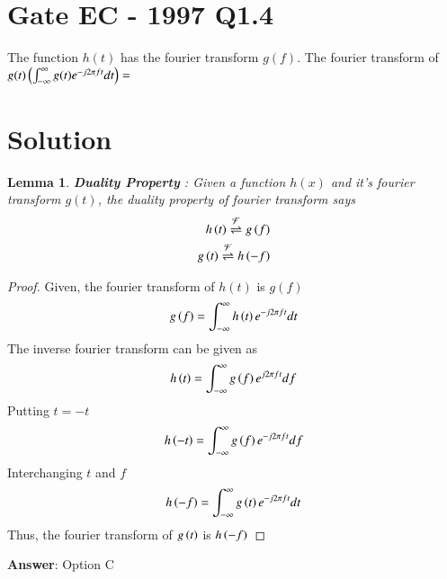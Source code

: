 \documentclass[journal,12pt,twocolumn]{IEEEtran}
\newtheorem{lemma}[theorem]{Lemma}
\begin{document}
\section*{Gate EC - 1997 Q1.4}
The function $h(t)$ has the fourier transform $g(f)$. The fourier transform of $g(t) \left( \int_{-\infty}^{\infty} g(t) e^{-j2\pi f t} dt\right) = $
\section*{Solution}
\begin{lemma}
\textbf{Duality Property} : Given a function $h(x)$ and it's fourier transform $g(t)$, the duality property of fourier transform says
\begin{align}
    h\left(t\right) \overset{\mathcal{F}}{ \rightleftharpoons}{g} \left(f\right)\\
    g\left(t\right) \overset{\mathcal{F}}{ \rightleftharpoons}{h} \left(-f\right)
\end{align}
\end{lemma}
\begin{proof}
Given, the fourier transform of $h(t)$ is $g(f)$
\begin{align}
    g\left(f\right) = \int_{-\infty}^{\infty} h\left(t\right) e^{-j2\pi ft} dt
\end{align}
The inverse fourier transform can be given as
\begin{align}
    h\left(t\right) = \int_{-\infty}^{\infty} g\left(f\right) e^{j2\pi ft} df
\end{align}
Putting $t = -t$
\begin{align}
    h\left(-t\right) = \int_{-\infty}^{\infty} g\left(f\right) e^{-j2\pi ft} df
\end{align}
Interchanging $t$ and $f$
\begin{align}
    h\left(-f\right) = \int_{-\infty}^{\infty} g\left(t\right) e^{-j2\pi f t} dt
\end{align}
Thus, the fourier transform of $g\left(t\right)$ is $h\left(-f\right)$
\end{proof}
\textbf{Answer}: Option C
\end{document}
